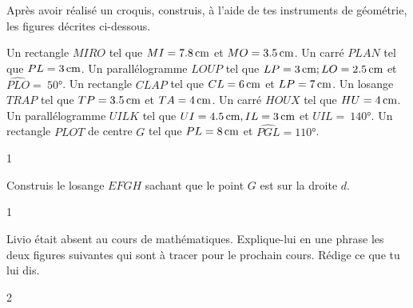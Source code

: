 \documentclass[a4paper,11pt]{report}
\begin{document}
\begin{exo}{
Après avoir réalisé un croquis, construis, à l'aide de tes instruments de géométrie, les figures décrites ci-dessous.
\begin{tasks}[after-item-skip = 0.5em]
	\task Un rectangle $MIRO$ tel que $MI = \tunit{7,8}{cm}$ et $MO = \tunit{3,5}{\cm}$.
	\task Un carré $PLAN$ tel que $PL =  \tunit{3}{\cm}$.
	\task Un parallélogramme $LOUP$ tel que $LP = \tunit{3}{\cm} ; LO = \tunit{2,5}{\cm}$ et $\widehat{PLO}=~\ang{50}$.
	\task Un rectangle $CLAP$ tel que $CL =  \tunit{6}{\cm}$ et $LP = \tunit{7}{\cm}$.
	\task Un losange $TRAP$ tel que $TP = \tunit{3,5}{\cm}$ et $TA = \tunit{4}{\cm}$.
	\task Un carré $HOUX$ tel que $HU = \tunit{4}{\cm}$.
	\task Un parallélogramme $UILK$ tel que  $UI = \tunit{4,5}{\cm}, IL = \tunit{3}{\cm}$ et $UIL=~\ang{140}$.
	\task Un rectangle $PLOT$ de centre $G$ tel que $PL = \tunit{8}{\cm}$ et $\widehat{PGL} = \ang{110}$.
\end{tasks}
}{1}
\end{exo}




\begin{exo}{
Construis le losange $EFGH$ sachant que le point $G$ est sur la droite $d$.
\begin{center}
\end{center}
}{1}
\end{exo}


\begin{exo}{
Livio était absent au cours de mathématiques. Explique-lui en une phrase les deux figures suivantes qui sont à tracer pour le prochain cours. Rédige ce que tu lui dis.
\begin{center}
 
\end{center}
}{2}
\end{exo}

\end{document}
